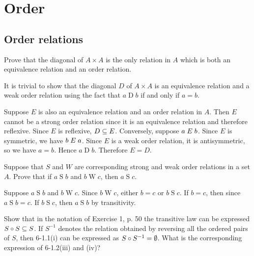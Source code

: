 \chapter{Order}
\section{Order relations}
\begin{exercise}
Prove that the diagonal of $A\times A$ is the only relation in $A$ which is both
an equivalence relation and an order relation.
\end{exercise}

\begin{solution}
It is trivial to show that the diagonal $D$ of $A\times A$ is an equivalence relation
and a weak order relation using the fact that $a\mathrel D b$ if and only if $a=b$.

Suppose $E$ is also an equivalence relation and an order relation in $A$.
Then $E$ cannot be a strong order relation since it is an equivalence relation and therefore reflexive.
Since $E$ is reflexive, $D\subseteq E$.
Conversely, suppose $a\mathrel{E} b$.
Since $E$ is symmetric, we have $b\mathrel{E} a$.
Since $E$ is a weak order relation, it is antisymmetric, so
we have $a=b$. Hence $a\mathrel D b$. Therefore $E = D$.
\end{solution}

\begin{exercise}
Suppose that $S$ and $W$ are corresponding strong and weak order relations in a set $A$.
Prove that if $a\mathrel S b$ and $b\mathrel W c$, then $a\mathrel S c$.
\end{exercise}

\begin{solution}
Suppose $a\mathrel S b$ and $b\mathrel W c$. Since $b\mathrel W c$, either $b=c$ or $b\mathrel S c$.
If $b=c$, then since $a\mathrel S b=c$.
If $b\mathrel S c$, then $a\mathrel S b$ by transitivity.
\end{solution}

\begin{exercise}
Show that in the notation of Exercise 1, p. 50 the transitive law can be expressed
$S\circ S\subseteq S$. If $S^{-1}$ denotes the relation obtained by reversing all the ordered pairs of $S$,
then 6-1.1(i) can be expressed as $S\circ S^{-1}=\emptyset$. What is the corresponding expression
of 6-1.2(iii) and (iv)?
\end{exercise}

